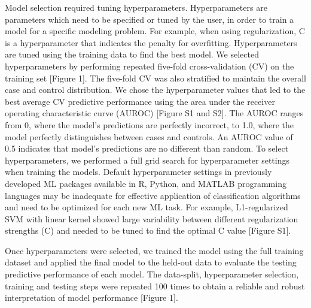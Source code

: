\documentclass[11pt,]{article}
\begin{document}
Model selection required tuning hyperparameters. Hyperparameters are
parameters which need to be specified or tuned by the user, in order to
train a model for a specific modeling problem. For example, when using
regularization, C is a hyperparameter that indicates the penalty for
overfitting. Hyperparameters are tuned using the training data to find
the best model. We selected hyperparameters by performing repeated
five-fold cross-validation (CV) on the training set {[}Figure 1{]}. The
five-fold CV was also stratified to maintain the overall case and
control distribution. We chose the hyperparameter values that led to the
best average CV predictive performance using the area under the receiver
operating characteristic curve (AUROC) {[}Figure S1 and S2{]}. The AUROC
ranges from 0, where the model's predictions are perfectly incorrect, to
1.0, where the model perfectly distinguishes between cases and controls.
An AUROC value of 0.5 indicates that model's predictions are no
different than random. To select hyperparameters, we performed a full
grid search for hyperparameter settings when training the models.
Default hyperparameter settings in previously developed ML packages
available in R, Python, and MATLAB programming languages may be
inadequate for effective application of classification algorithms and
need to be optimized for each new ML task. For example, L1-regularized
SVM with linear kernel showed large variability between different
regularization strengths (C) and needed to be tuned to find the optimal
C value {[}Figure S1{]}.

Once hyperparameters were selected, we trained the model using the full
training dataset and applied the final model to the held-out data to
evaluate the testing predictive performance of each model. The
data-split, hyperparameter selection, training and testing steps were
repeated 100 times to obtain a reliable and robust interpretation of
model performance {[}Figure 1{]}.
\end{document}
